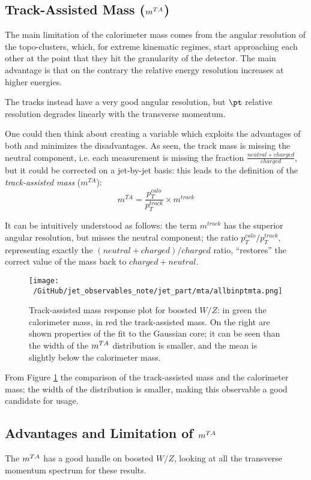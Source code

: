 
\subsection{Track-Assisted Mass ($\mta$)}
The main limitation of the calorimeter mass comes from the angular resolution of the topo-clusters, which, for extreme kinematic regimes, start approaching each other at the point that they hit the granularity of the detector. The main advantage is that on the contrary the relative energy resolution increases at higher energies.

The tracks instead have a very good angular resolution, but $\pt$ relative resolution degrades linearly with the transverse momentum. 

One could then think about creating a variable which exploits the advantages of both and minimizes the disadvantages. As seen, the track mass is missing the neutral component, i.e. each measurement is missing the fraction $\frac{neutral+charged}{charged}$, but it could be corrected on a jet-by-jet basis: this leads to the definition of the \textit{track-assisted mass} ($m^{TA}$):
\begin{equation}
 m^{TA}=\frac{p_T^{calo}}{p_T^{track}}\times m^{track}
\end{equation}

It can be intuitively understood as follows: the term $m^{track}$ has the superior angular resolution, but misses the neutral component; the ratio $p_T^{calo}/p_T^{track}$, representing exactly the $(neutral+charged)/charged$ ratio, ``restores'' the correct value of the mass back to $charged+neutral$.
\begin{figure}[!ht]
  \centering
      \texttt{[image: ~/GitHub/jet\_observables\_note/jet\_part/mta/allbinptmta.png]}
  \caption[$\mcal$ and $\mta$ mass responses]{Track-assisted mass response plot for boosted $W/Z$: in green the calorimeter mass, in red the track-assisted mass. On the right are shown properties of the fit to the Gaussian core; it can be seen than the width of the $\mta$ distribution is smaller, and the mean is slightly below the calorimeter mass.}
  \label{fig:mta1}
\end{figure}

From Figure \ref{fig:mta1} the comparison of the track-assisted mass and the calorimeter mass; the width of the distribution is smaller, making this observable a good candidate for usage.


\subsection{Advantages and Limitation of $\mta$}
The $\mta$ has a good handle on boosted $W/Z$, looking at all the transverse momentum spectrum for these results.


